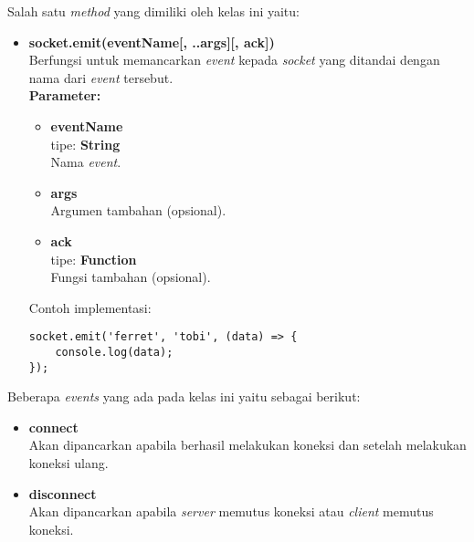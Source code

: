 \begin{enumerate}
	Salah satu \textit{method} yang dimiliki oleh kelas ini yaitu:
	
	\begin{itemize}
		
%	
	
	\item \textbf{socket.emit(eventName[, ..args][, ack])} \\ 
	Berfungsi untuk memancarkan \textit{event} kepada \textit{socket} yang ditandai dengan nama dari \textit{event} tersebut.\\ 
	\textbf{Parameter:}
	\begin{itemize}
		\item \textbf{eventName} \\tipe: \textbf{String} \\ Nama \textit{event}.
		\item \textbf{args} \\ Argumen tambahan (opsional).
		\item \textbf{ack} \\tipe: \textbf{Function} \\ Fungsi tambahan (opsional).
	\end{itemize}
	Contoh implementasi:
\begin{lstlisting}
socket.emit('ferret', 'tobi', (data) => {
	console.log(data);
});
\end{lstlisting}
	
	\end{itemize}

	Beberapa \textit{events} yang ada pada kelas ini yaitu sebagai berikut:
	\begin{itemize}
		\item \textbf{connect} \\ Akan dipancarkan apabila berhasil melakukan koneksi dan setelah melakukan koneksi ulang.
		\item \textbf{disconnect} \\ Akan dipancarkan apabila \textit{server} memutus koneksi atau \textit{client} memutus koneksi.
	\end{itemize}
\end{enumerate} 

